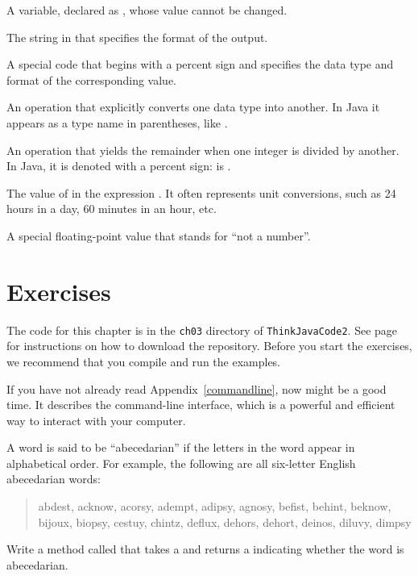 \begin{description}
A variable, declared as , whose value cannot be changed.

The string in  that specifies the format of the output.

A special code that begins with a percent sign and specifies the data type and format of the corresponding value.

An operation that explicitly converts one data type into another.
In Java it appears as a type name in parentheses, like .


An operation that yields the remainder when one integer is divided by another.
In Java, it is denoted with a percent sign:  is .

The value of  in the expression .
It often represents unit conversions, such as 24 hours in a day, 60 minutes in an hour, etc.

A special floating-point value that stands for ``not a number''.

\end{description}


\section{Exercises}

The code for this chapter is in the {\tt ch03} directory of {\tt ThinkJavaCode2}.
See page~\pageref{code} for instructions on how to download the repository.
Before you start the exercises, we recommend that you compile and run the examples.

If you have not already read Appendix~\ref{commandline}, now might be a good time.
It describes the command-line interface, which is a powerful and efficient way to interact with your computer.

\begin{exercise}  %


A word is said to be ``abecedarian'' if the letters in the word appear in alphabetical order.
For example, the following are all six-letter English abecedarian words:

\begin{quote}
abdest, acknow, acorsy, adempt, adipsy, agnosy, befist, behint, %
beknow, bijoux, biopsy, cestuy, chintz, deflux, dehors, dehort, %
deinos, diluvy, dimpsy %
\end{quote}

Write a method called  that takes a  and returns a  indicating whether the word is abecedarian.

\end{exercise}


